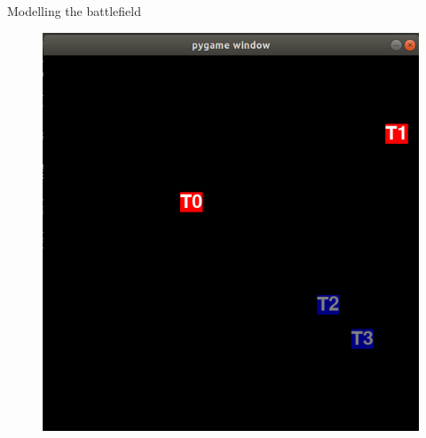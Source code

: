\documentclass{beamer}
\begin{document}
\begin{frame}{Modelling the battlefield}
\begin{figure}[htp]
    \centering
    \includegraphics[scale=0.3]{images/game_visual.png}
\end{figure}
\end{frame}
\end{document}
